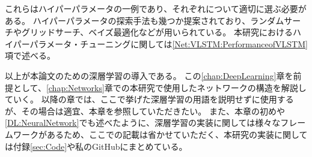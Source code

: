 これらはハイパーパラメータの一例であり、それぞれについて適切に選ぶ必要がある。
ハイパーパラメータの探索手法も幾つか提案されており、ランダムサーチやグリッドサーチ、ベイズ最適化などが用いられている。
本研究におけるハイパーパラメータ・チューニングに関しては\ref{Net:VLSTM:PerformanceofVLSTM}項で述べる。

以上が本論文のための深層学習の導入である。
この\ref{chap:DeepLearning}章を前提として、\ref{chap:Networks}章での本研究で使用したネットワークの構造を解説していく。
以降の章では、ここで挙げた深層学習の用語を説明せずに使用するが、その場合は適宜、本章を参照していただきたい。
また、本章の初めや\ref{DL:NeuralNetwork}でも述べたように、深層学習の実装に関しては様々なフレームワークがあるため、ここでの記載は省かせていただく、本研究の実装に関しては付録\ref{sec:Code}や私のGitHub\cite{GitHubGotoK}にまとめている。















